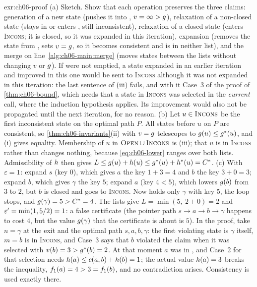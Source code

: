 \begin{solution}{exr:ch06-proof}
(a) Sketch. Show that each operation preserves the three claims: generation of a new state (pushes it into \Open, $v = \infty > g$), relaxation of a non-closed state (stays in or enters \Open, still inconsistent), relaxation of a closed state (enters \textsc{Incons}; it is closed, so it was expanded in this iteration), expansion (removes the state from \Open, sets $v = g$, so it becomes consistent and is in neither list), and the merge on line~\ref{alg:ch06-main:merge} (moves states between the lists without changing $v$ or $g$). If \Closed were not emptied, a state expanded in an earlier iteration and improved in this one would be sent to \textsc{Incons} although it was not expanded in this iteration: the last sentence of (iii) fails, and with it Case~3 of the proof of \cref{thm:ch06-bound}, which needs that a state in \textsc{Incons} was selected in the \emph{current} call, where the induction hypothesis applies. Its improvement would also not be propagated until the next iteration, for no reason. (b) Let $u \in \textsc{Incons}$ be the first inconsistent state on the optimal path $P$. All states before $u$ on $P$ are consistent, so \cref{thm:ch06-invariants}(ii) with $v = g$ telescopes to $g(u) \le g^*(u)$, and (i) gives equality. Membership of $u$ in $\textsc{Open} \cup \textsc{Incons}$ is (iii); that $u$ is in \textsc{Incons} rather than \Open changes nothing, because \cref{eq:ch06-lower} ranges over both lists. Admissibility of $h$ then gives $L \le g(u) + h(u) \le g^*(u) + h^*(u) = C^*$. (c) With $\varepsilon = 1$: expand $s$ (key $0$), which gives $a$ the key $1 + 3 = 4$ and $b$ the key $3 + 0 = 3$; expand $b$, which gives $\gamma$ the key $5$; expand $a$ (key $4 < 5$), which lowers $g(b)$ from $3$ to $2$, but $b$ is closed and goes to \textsc{Incons}. Now \Open holds only $\gamma$ with key $5$, the loop stops, and $g(\gamma) = 5 > C^* = 4$. The lists give $L = \min(5,\ 2 + 0) = 2$ and $\varepsilon' = \min(1, 5/2) = 1$: a false certificate (the pointer path $s \to a \to b \to \gamma$ happens to cost $4$, but the value $g(\gamma)$ that the certificate is about is $5$). In the proof, take $n = \gamma$ at the exit and the optimal path $s, a, b, \gamma$: the first violating state is $\gamma$ itself, $m = b$ is in \textsc{Incons}, and Case~3 says that $b$ violated the claim when it was selected with $v(b) = 3 > g^*(b) = 2$. At that moment $a$ was in \Open, and Case~2 for that selection needs $h(a) \le c(a,b) + h(b) = 1$; the actual value $h(a) = 3$ breaks the inequality, $f_1(a) = 4 > 3 = f_1(b)$, and no contradiction arises. Consistency is used exactly there.
\end{solution}

